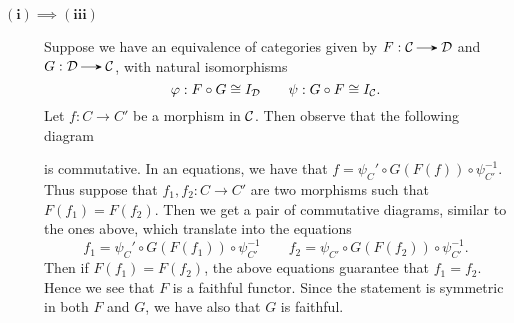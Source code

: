     \begin{prf}
        \begin{description}
            \item[$\bm{(i) \implies (iii)}$] 
            Suppose we have an equivalence of categories given by $F:
            \cc \to \dd$ and $G: \dd \to \cc$, with natural
            isomorphisms 
            \[
                \varphi: F \circ G \cong I_{\mathcal{D}} \qquad \psi: G \circ F \cong I_{\mathcal{C}}.
            \]
            Let $f: C \to C'$ be a morphism in $\mathcal{C}$. Then observe
            that the following diagram
            \begin{center}
                \hspace{1cm}
            \end{center}
            is commutative. In an equations, we have that $f = \psi_C'
            \circ G(F(f)) \circ \psi_{C'}^{-1}$. Thus suppose that
            $f_1, f_2: C \to C'$ are two morphisms such that $F(f_1)
            =F(f_2)$. Then we get a pair of commutative diagrams,
            similar to the ones above, which translate into the
            equations 
            \[
                f_1 = \psi_{C}'\circ G(F(f_1)) \circ \psi_{C'}^{-1}  
                \qquad 
                f_2 = \psi_{C'}\circ G(F(f_2)) \circ \psi_{C'}^{-1}.
            \]
            Then if $F(f_1) = F(f_2)$, the above equations guarantee
            that $f_1 = f_2$. Hence we see that $F$ is a faithful
            functor. Since the statement is symmetric in both $F$ and
            $G$, we have also that $G$ is faithful.
            

\end{description}
\end{prf}

